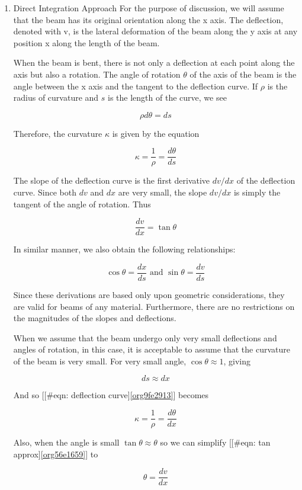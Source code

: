 \documentclass[a4paper,openany,12pt]{book}
\begin{document}
\begin{enumerate}
\item Direct Integration Approach
\label{sec:org6e4c301}
For the purpose of discussion, we will assume that the beam has its
original orientation along the x axis. The deflection, denoted with v,
is the lateral deformation of the beam along the y axis at any position
x along the length of the beam.

When the beam is bent, there is not only a deflection at each point
along the axis but also a rotation. The angle of rotation \(\theta\) of
the axis of the beam is the angle between the x axis and the tangent to
the deflection curve. If \(\rho\) is the radius of curvature and \(s\) is
the length of the curve, we see


$$\rho d\theta  = ds$$

Therefore, the curvature \(\kappa\) is given by the equation

$$ \kappa  = \frac{1}{\rho } = \frac{d\theta }{ds}$$

The slope of the deflection curve is the first derivative \(dv/dx\) of the
deflection curve. Since both \(dv\) and \(dx\) are very small, the slope
\(dv/dx\) is simply the tangent of the angle of rotation. Thus

$$ \frac{dv}{dx} = \tan \theta$$

In similar manner, we also obtain the following relationships:

$$\cos \theta  = \frac{dx}{ds} \text{ and } \sin \theta  = \frac{dv}{ds}$$

Since these derivations are based only upon geometric considerations,
they are valid for beams of any material. Furthermore, there are no
restrictions on the magnitudes of the slopes and deflections.

When we assume that the beam undergo only very small deflections and
angles of rotation, in this case, it is acceptable to assume that the
curvature of the beam is very small. For very small angle,
\(\cos\theta \approx 1\), giving

$$ds \approx dx$$

And so [[\#eqn: deflection curve]\ref{org9fe2913}] becomes

$$ \kappa  = \frac{1}{\rho } = \frac{d\theta }{dx}$$

Also, when the angle is small \(\tan\theta \approx \theta\) so we can
simplify [[\#eqn: tan approx]\ref{org56e1659}] to

$$\theta  = \frac{dv}{dx}$$


\end{enumerate}
\end{document}
